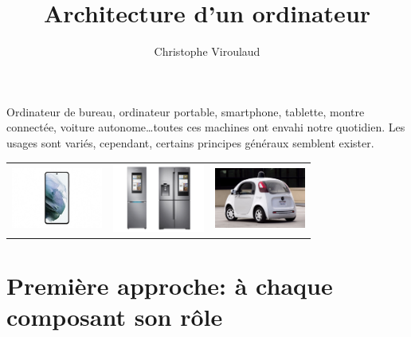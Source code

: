 \documentclass[svgnames,11pt]{beamer}
\author[]{Christophe Viroulaud}
\title{Architecture d'un ordinateur}
\date{}
\institute{Première - NSI}
\begin{document}
\begin{frame}
\titlepage
\end{frame}
\begin{frame}
    \frametitle{}

Ordinateur de bureau, ordinateur portable, smartphone, tablette, montre connectée, voiture autonome\dots toutes ces machines ont envahi notre quotidien. Les usages sont variés, cependant, certains principes généraux semblent exister.
\begin{center}
    \begin{tabular}{ccc}
        \includegraphics[width=3cm]{ressources/smartphone.jpeg}&
        \includegraphics[width=3cm]{ressources/frigo.png}&
        \includegraphics[width=3cm]{ressources/voiture.jpg}
    \end{tabular}
\end{center}

\end{frame}
\section{Première approche: à chaque composant son rôle}
\end{document}
